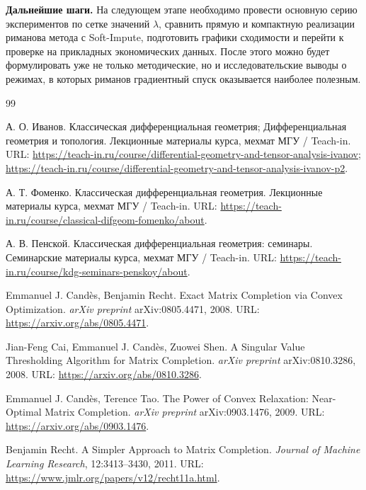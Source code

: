 \documentclass[a4paper,12pt]{article}
\begin{document}
\textbf{Дальнейшие шаги.} На следующем этапе необходимо провести основную серию экспериментов по сетке значений $\lambda$, сравнить прямую и компактную реализации риманова метода с Soft-Impute, подготовить графики сходимости и перейти к проверке на прикладных экономических данных. После этого можно будет формулировать уже не только методические, но и исследовательские выводы о режимах, в которых риманов градиентный спуск оказывается наиболее полезным.

\begin{thebibliography}{99}

А. О. Иванов.
\newblock Классическая дифференциальная геометрия; Дифференциальная геометрия и топология.
\newblock Лекционные материалы курса, мехмат МГУ / Teach-in.
\newblock URL: \url{https://teach-in.ru/course/differential-geometry-and-tensor-analysis-ivanov};
\url{https://teach-in.ru/course/differential-geometry-and-tensor-analysis-ivanov-p2}.

А. Т. Фоменко.
\newblock Классическая дифференциальная геометрия.
\newblock Лекционные материалы курса, мехмат МГУ / Teach-in.
\newblock URL: \url{https://teach-in.ru/course/classical-difgeom-fomenko/about}.

А. В. Пенской.
\newblock Классическая дифференциальная геометрия: семинары.
\newblock Семинарские материалы курса, мехмат МГУ / Teach-in.
\newblock URL: \url{https://teach-in.ru/course/kdg-seminars-penskoy/about}.

Emmanuel J. Cand\`es, Benjamin Recht.
\newblock Exact Matrix Completion via Convex Optimization.
\newblock \textit{arXiv preprint} arXiv:0805.4471, 2008.
\newblock URL: \url{https://arxiv.org/abs/0805.4471}.

Jian-Feng Cai, Emmanuel J. Cand\`es, Zuowei Shen.
\newblock A Singular Value Thresholding Algorithm for Matrix Completion.
\newblock \textit{arXiv preprint} arXiv:0810.3286, 2008.
\newblock URL: \url{https://arxiv.org/abs/0810.3286}.

Emmanuel J. Cand\`es, Terence Tao.
\newblock The Power of Convex Relaxation: Near-Optimal Matrix Completion.
\newblock \textit{arXiv preprint} arXiv:0903.1476, 2009.
\newblock URL: \url{https://arxiv.org/abs/0903.1476}.

Benjamin Recht.
\newblock A Simpler Approach to Matrix Completion.
\newblock \textit{Journal of Machine Learning Research}, 12:3413--3430, 2011.
\newblock URL: \url{https://www.jmlr.org/papers/v12/recht11a.html}.


\end{thebibliography}
\end{document}
